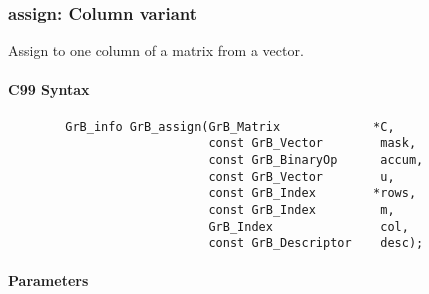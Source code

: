 \subsubsection{{\sf assign}: Column variant}

Assign to one column of a matrix from a vector.  

\paragraph{C99 Syntax}

\begin{verbatim}
        GrB_info GrB_assign(GrB_Matrix             *C,
                            const GrB_Vector        mask,
                            const GrB_BinaryOp      accum,
                            const GrB_Vector        u,
                            const GrB_Index        *rows,
                            const GrB_Index         m,
                            GrB_Index               col,
                            const GrB_Descriptor    desc); 
\end{verbatim}

\paragraph{Parameters}

